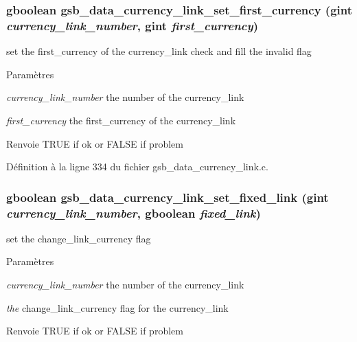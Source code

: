\subsubsection[{gsb\_\-data\_\-currency\_\-link\_\-set\_\-first\_\-currency}]{\setlength{\rightskip}{0pt plus 5cm}gboolean gsb\_\-data\_\-currency\_\-link\_\-set\_\-first\_\-currency (gint {\em currency\_\-link\_\-number}, \/  gint {\em first\_\-currency})}\label{gsb__data__currency__link_8c_a299015b16318ea3ffb9962b8e57f43d9}
set the first\_\-currency of the currency\_\-link check and fill the invalid flag


\begin{DoxyParams}{Paramètres}
\item[{\em currency\_\-link\_\-number}]the number of the currency\_\-link \item[{\em first\_\-currency}]the first\_\-currency of the currency\_\-link\end{DoxyParams}
\begin{DoxyReturn}{Renvoie}
TRUE if ok or FALSE if problem 
\end{DoxyReturn}


Définition à la ligne 334 du fichier gsb\_\-data\_\-currency\_\-link.c.

\subsubsection[{gsb\_\-data\_\-currency\_\-link\_\-set\_\-fixed\_\-link}]{\setlength{\rightskip}{0pt plus 5cm}gboolean gsb\_\-data\_\-currency\_\-link\_\-set\_\-fixed\_\-link (gint {\em currency\_\-link\_\-number}, \/  gboolean {\em fixed\_\-link})}\label{gsb__data__currency__link_8c_a82b5b120da2c6a35a220b2aec872dd89}
set the change\_\-link\_\-currency flag


\begin{DoxyParams}{Paramètres}
\item[{\em currency\_\-link\_\-number}]the number of the currency\_\-link \item[{\em the}]change\_\-link\_\-currency flag for the currency\_\-link\end{DoxyParams}
\begin{DoxyReturn}{Renvoie}
TRUE if ok or FALSE if problem 
\end{DoxyReturn}


